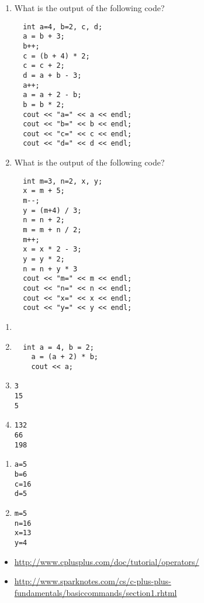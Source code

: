 \begin{enumerate}
\item What is the output of the following code?
\begin{lstlisting}
  int a=4, b=2, c, d;
  a = b + 3;
  b++;
  c = (b + 4) * 2;
  c = c + 2;
  d = a + b - 3;
  a++;
  a = a + 2 - b;
  b = b * 2;
  cout << "a=" << a << endl;  
  cout << "b=" << b << endl;  
  cout << "c=" << c << endl;  
  cout << "d=" << d << endl; 
\end{lstlisting}

\item What is the output of the following code?
\begin{lstlisting}
  int m=3, n=2, x, y;
  x = m + 5;
  m--;
  y = (m+4) / 3;
  n = n + 2;
  m = m + n / 2;
  m++;
  x = x * 2 - 3;
  y = y * 2;
  n = n + y * 3
  cout << "m=" << m << endl; 
  cout << "n=" << n << endl;  
  cout << "x=" << x << endl;   
  cout << "y=" << y << endl; 
\end{lstlisting}
\end{enumerate}

\begin{enumerate}
\item {}

\item
\begin{lstlisting}
  int a = 4, b = 2;
	a = (a + 2) * b;
	cout << a;
\end{lstlisting}

\item 
\begin{lstlisting}
3
15
5
\end{lstlisting}

\item
\begin{lstlisting}
132
66
198
\end{lstlisting}

\end{enumerate}

\begin{enumerate}
\item
\begin{lstlisting}
a=5
b=6
c=16
d=5
\end{lstlisting}

\item
\begin{lstlisting}
m=5
n=16
x=13
y=4
\end{lstlisting}
\end{enumerate}

\begin{itemize}
\item \url{http://www.cplusplus.com/doc/tutorial/operators/}
\item \url{http://www.sparknotes.com/cs/c-plus-plus-fundamentals/basiccommands/section1.rhtml}
\end{itemize}